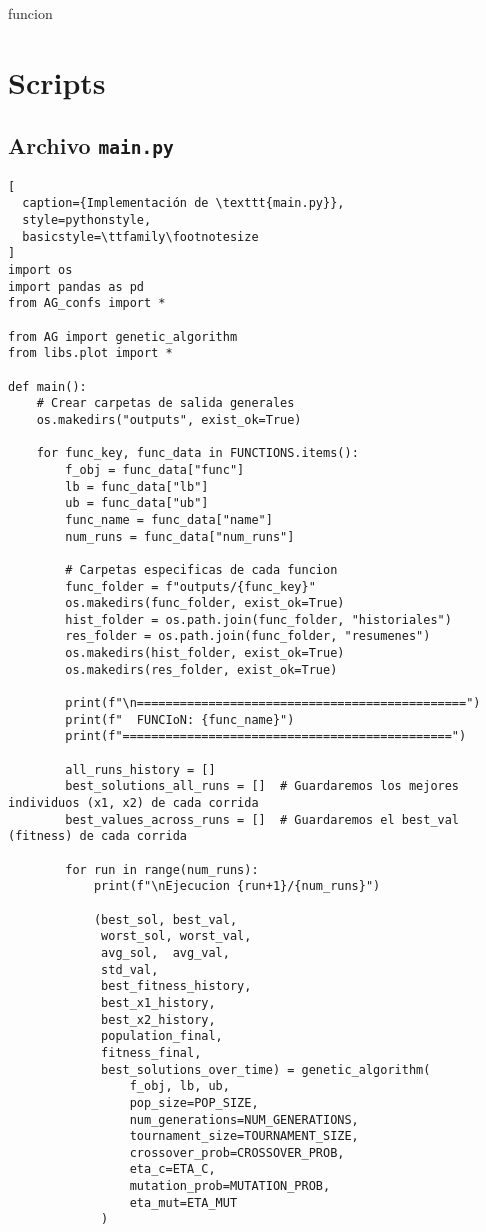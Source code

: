 funcion\chapter{Scripts}

\section{Archivo \texttt{main.py}}
\begin{lstlisting}[
  caption={Implementación de \texttt{main.py}},
  style=pythonstyle,
  basicstyle=\ttfamily\footnotesize
]
import os
import pandas as pd
from AG_confs import *

from AG import genetic_algorithm
from libs.plot import *

def main():
    # Crear carpetas de salida generales
    os.makedirs("outputs", exist_ok=True)
    
    for func_key, func_data in FUNCTIONS.items():
        f_obj = func_data["func"]
        lb = func_data["lb"]
        ub = func_data["ub"]
        func_name = func_data["name"]
        num_runs = func_data["num_runs"]
        
        # Carpetas especificas de cada funcion
        func_folder = f"outputs/{func_key}"
        os.makedirs(func_folder, exist_ok=True)
        hist_folder = os.path.join(func_folder, "historiales")
        res_folder = os.path.join(func_folder, "resumenes")
        os.makedirs(hist_folder, exist_ok=True)
        os.makedirs(res_folder, exist_ok=True)
        
        print(f"\n==============================================")
        print(f"  FUNCIoN: {func_name}")
        print(f"==============================================")
        
        all_runs_history = []
        best_solutions_all_runs = []  # Guardaremos los mejores individuos (x1, x2) de cada corrida
        best_values_across_runs = []  # Guardaremos el best_val (fitness) de cada corrida
        
        for run in range(num_runs):
            print(f"\nEjecucion {run+1}/{num_runs}")
            
            (best_sol, best_val,
             worst_sol, worst_val,
             avg_sol,  avg_val,
             std_val,
             best_fitness_history,
             best_x1_history,
             best_x2_history,
             population_final,
             fitness_final,
             best_solutions_over_time) = genetic_algorithm(
                 f_obj, lb, ub,
                 pop_size=POP_SIZE,
                 num_generations=NUM_GENERATIONS,
                 tournament_size=TOURNAMENT_SIZE,
                 crossover_prob=CROSSOVER_PROB,
                 eta_c=ETA_C,
                 mutation_prob=MUTATION_PROB,
                 eta_mut=ETA_MUT
             )
            

\end{lstlisting}

